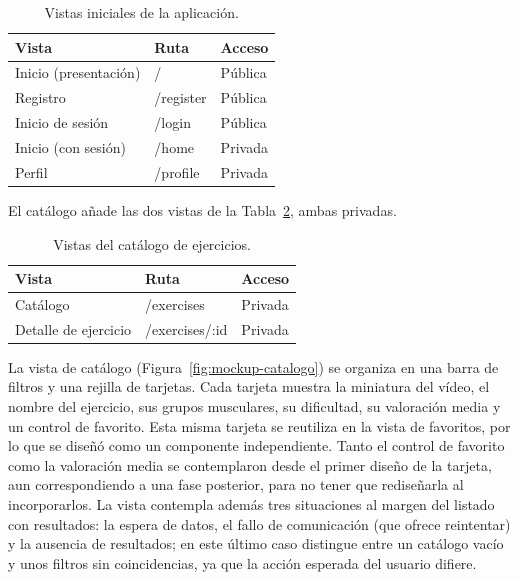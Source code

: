 \documentclass[12pt,a4paper,twoside,openright]{book}
\begin{document}
    \begin{table}[htbp]
        \centering
        \begin{tabular}{lll}
            \toprule
            \textbf{Vista} & \textbf{Ruta} & \textbf{Acceso} \\
            \midrule
            Inicio (presentación) & /         & Pública \\
            Registro              & /register & Pública \\
            Inicio de sesión      & /login    & Pública \\
            Inicio (con sesión)   & /home     & Privada \\
            Perfil                & /profile  & Privada \\
            \bottomrule
        \end{tabular}
        \caption{Vistas iniciales de la aplicación.}
        \label{tab:vistas-e1}
    \end{table}

    El catálogo añade las dos vistas de la Tabla~\ref{tab:vistas-e2}, ambas
    privadas.

    \begin{table}[htbp]
        \centering
        \begin{tabular}{lll}
            \toprule
            \textbf{Vista} & \textbf{Ruta} & \textbf{Acceso} \\
            \midrule
            Catálogo             & /exercises      & Privada \\
            Detalle de ejercicio & /exercises/:id  & Privada \\
            \bottomrule
        \end{tabular}
        \caption{Vistas del catálogo de ejercicios.}
        \label{tab:vistas-e2}
    \end{table}

    La vista de catálogo (Figura~\ref{fig:mockup-catalogo}) se organiza en una
    barra de filtros y una rejilla de tarjetas. Cada tarjeta muestra la miniatura
    del vídeo, el nombre del ejercicio, sus grupos musculares, su dificultad, su
    valoración media y un control de favorito. Esta misma tarjeta se reutiliza en
    la vista de favoritos, por lo que se diseñó como un componente independiente.
    Tanto el control de favorito como la valoración media se contemplaron desde el
    primer diseño de la tarjeta, aun correspondiendo a una fase posterior, para no
    tener que rediseñarla al incorporarlos. La vista contempla además tres situaciones
    al margen del listado con resultados: la espera de datos, el fallo de comunicación
    (que ofrece reintentar) y la ausencia de resultados; en este último caso distingue
    entre un catálogo vacío y unos filtros sin coincidencias, ya que la acción esperada del usuario difiere.
\end{document}
